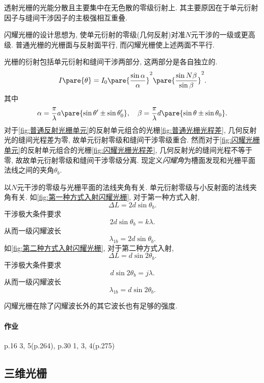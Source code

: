 \documentclass{ctexart}
\begin{document}
\begin{remark}
    透射光栅的光能分散且主要集中在无色散的零级衍射上. 其主要原因在于单元衍射因子与缝间干涉因子的主极强相互重叠.
\end{remark}
\par
闪耀光栅的设计思想为, 使单元衍射的零级(几何反射)对准$N$元干涉的一级或更高级. 普通光栅的光栅面与反射面平行, 而闪耀光栅使上述两面不平行.
\par
光栅的衍射包括单元衍射和缝间干涉两部分, 这两部分是各自独立的.
\[ I\pare{\theta} = I_0\pare{\frac{\sin \alpha}{\alpha}}^2 \pare{\frac{\sin N\beta}{\sin\beta}}^2. \]
其中
\[ \alpha = \frac{\pi}{\lambda}a\pare{\sin\theta' \pm \sin\theta'_0},\quad \beta = \frac{\pi}{\lambda}d\pare{\sin\theta\pm\sin\theta_0}. \]
对于\cref{fig:普通反射光栅单元}的反射单元组合的光栅\cref{fig:普通光栅光程差}, 几何反射光的缝间光程差为零, 故单元衍射零级和缝间干涉零级重合. 然而对于\cref{fig:闪耀光栅单元}的反射单元组合的光栅\cref{fig:闪耀光栅光程差}, 几何反射光的缝间光程不等于零, 故故单元衍射零级和缝间干涉零级分离. 现定义\emph{闪耀角}为槽面发现和光栅平面法线之间的夹角$\theta_b$.
\par
以$N$元干涉的零级与光栅平面的法线夹角有关. 单元衍射零级与小反射面的法线夹角有关. 如\cref{fig:第一种方式入射闪耀光栅}, 对于第一种方式入射,
\[ \Delta L = 2d\sin\theta_b. \]
干涉极大条件要求
\[ 2d\sin\theta_b = k\lambda. \]
从而一级闪耀波长
\[ \lambda_{1b} = 2d\sin\theta_b. \]
如\cref{fig:第二种方式入射闪耀光栅}, 对于第二种方式入射,
\[ \Delta L = d\sin 2\theta_b. \]
干涉极大条件要求
\[ d\sin 2\theta_b = j\lambda. \]
从而一级闪耀波长
\[ \lambda_{1b} = d\sin 2\theta_b. \]
\begin{remark}
    闪耀光栅在除了闪耀波长外的其它波长也有足够的强度.
\end{remark}

\paragraph{作业} %
\label{par:作业}

p.16 3, 5(p.264), p.30 1, 3, 4(p.275)




\subsection{三维光栅} %
\label{sub:三维光栅}
\end{document}
